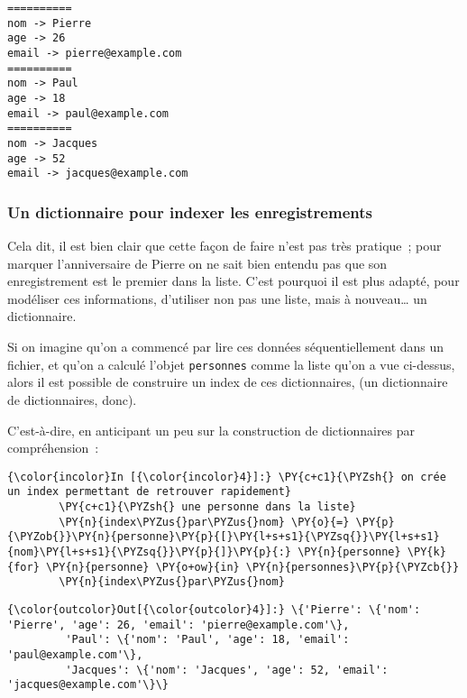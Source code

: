     \begin{Verbatim}[commandchars=\\\{\},frame=single,framerule=0.3mm,rulecolor=\color{cellframecolor}]
==========
nom -> Pierre
age -> 26
email -> pierre@example.com
==========
nom -> Paul
age -> 18
email -> paul@example.com
==========
nom -> Jacques
age -> 52
email -> jacques@example.com
\end{Verbatim}

    \hypertarget{un-dictionnaire-pour-indexer-les-enregistrements}{%
\subsubsection{Un dictionnaire pour indexer les
enregistrements}\label{un-dictionnaire-pour-indexer-les-enregistrements}}

    Cela dit, il est bien clair que cette façon de faire n'est pas très
pratique~; pour marquer l'anniversaire de Pierre on ne sait bien entendu
pas que son enregistrement est le premier dans la liste. C'est pourquoi
il est plus adapté, pour modéliser ces informations, d'utiliser non pas
une liste, mais à nouveau\ldots{} un dictionnaire.

Si on imagine qu'on a commencé par lire ces données séquentiellement
dans un fichier, et qu'on a calculé l'objet \texttt{personnes} comme la
liste qu'on a vue ci-dessus, alors il est possible de construire un
index de ces dictionnaires, (un dictionnaire de dictionnaires, donc).

C'est-à-dire, en anticipant un peu sur la construction de dictionnaires
par compréhension~:

    \begin{Verbatim}[commandchars=\\\{\},frame=single,framerule=0.3mm,rulecolor=\color{cellframecolor}]
{\color{incolor}In [{\color{incolor}4}]:} \PY{c+c1}{\PYZsh{} on crée un index permettant de retrouver rapidement}
        \PY{c+c1}{\PYZsh{} une personne dans la liste}
        \PY{n}{index\PYZus{}par\PYZus{}nom} \PY{o}{=} \PY{p}{\PYZob{}}\PY{n}{personne}\PY{p}{[}\PY{l+s+s1}{\PYZsq{}}\PY{l+s+s1}{nom}\PY{l+s+s1}{\PYZsq{}}\PY{p}{]}\PY{p}{:} \PY{n}{personne} \PY{k}{for} \PY{n}{personne} \PY{o+ow}{in} \PY{n}{personnes}\PY{p}{\PYZcb{}}
        \PY{n}{index\PYZus{}par\PYZus{}nom}
\end{Verbatim}


\begin{Verbatim}[commandchars=\\\{\},frame=single,framerule=0.3mm,rulecolor=\color{cellframecolor}]
{\color{outcolor}Out[{\color{outcolor}4}]:} \{'Pierre': \{'nom': 'Pierre', 'age': 26, 'email': 'pierre@example.com'\},
         'Paul': \{'nom': 'Paul', 'age': 18, 'email': 'paul@example.com'\},
         'Jacques': \{'nom': 'Jacques', 'age': 52, 'email': 'jacques@example.com'\}\}
\end{Verbatim}
            
